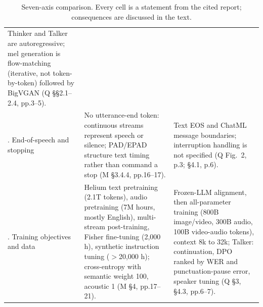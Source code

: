 \documentclass[11pt,a4paper,twocolumn]{article}
\newcommand{\M}{\textsc{M}}
\newcommand{\Q}{\textsc{Q}}
\begin{document}
\begin{table}[t]
\begin{tabular}{@{}>{\raggedright\arraybackslash}p{2.3cm}p{6.7cm}p{6.7cm}@{}}
Thinker and Talker are autoregressive; mel generation is flow-matching (iterative, not token-by-token) followed by BigVGAN (\Q{} \S\S2.1--2.4, pp.3--5). \\
6. End-of-speech and stopping &
No utterance-end token: continuous streams represent speech or silence; PAD/EPAD structure text timing rather than command a stop (\M{} \S3.4.4, pp.16--17). &
Text EOS and ChatML message boundaries; interruption handling is not specified (\Q{} Fig.~2, p.3; \S4.1, p.6). \\
7. Training objectives and data &
Helium text pretraining (2.1T tokens), audio pretraining (7M hours, mostly English), multi-stream post-training, Fisher fine-tuning (2{,}000 h), synthetic instruction tuning ($>$20{,}000 h); cross-entropy with semantic weight 100, acoustic 1 (\M{} \S4, pp.17--21). &
Frozen-LLM alignment, then all-parameter training (800B image/video, 300B audio, 100B video-audio tokens), context 8k to 32k; Talker: continuation, DPO ranked by WER and punctuation-pause error, speaker tuning (\Q{} \S3, \S4.3, pp.6--7). \\
\bottomrule
\end{tabular}
\caption{Seven-axis comparison. Every cell is a statement from the cited report; consequences are discussed in the text.}
\label{tab:axes}
\end{table}
\end{document}

